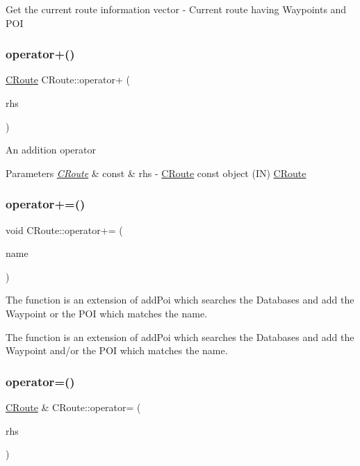 Get the current route information  vector -\/ Current route having Waypoints and P\+OI \mbox{\label{classCRoute_aa9d2cdf6f3a0ce51ca4ab0c4285004a9}} 
\subsubsection{\texorpdfstring{operator+()}{operator+()}}
{\footnotesize\ttfamily \hyperlink{classCRoute}{C\+Route} C\+Route\+::operator+ (\begin{DoxyParamCaption}\item[{\hyperlink{classCRoute}{C\+Route} const \&}]{rhs }\end{DoxyParamCaption})}

An addition operator 
\begin{DoxyParams}{Parameters}
{\em \hyperlink{classCRoute}{C\+Route}} & const \& rhs -\/ \hyperlink{classCRoute}{C\+Route} const object (IN)  \hyperlink{classCRoute}{C\+Route} \\
\hline
\end{DoxyParams}
\mbox{\label{classCRoute_a278402d6f68b924679c555a933b6312c}} 
\subsubsection{\texorpdfstring{operator+=()}{operator+=()}}
{\footnotesize\ttfamily void C\+Route\+::operator+= (\begin{DoxyParamCaption}\item[{\hyperlink{CRoute_8h_a112678f2c32c39b2d50c558d89dbde68}{Database\+\_\+key\+\_\+t} const \&}]{name }\end{DoxyParamCaption})}

The function is an extension of add\+Poi which searches the Databases and add the Waypoint or the P\+OI which matches the name.

The function is an extension of add\+Poi which searches the Databases and add the Waypoint and/or the P\+OI which matches the name. \mbox{\label{classCRoute_a898a4b296423fe629a771de487aae7fc}} 
\subsubsection{\texorpdfstring{operator=()}{operator=()}}
{\footnotesize\ttfamily \hyperlink{classCRoute}{C\+Route} \& C\+Route\+::operator= (\begin{DoxyParamCaption}\item[{\hyperlink{classCRoute}{C\+Route} const \&}]{rhs }\end{DoxyParamCaption})}

